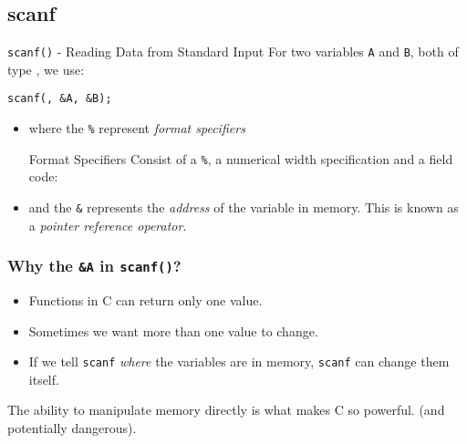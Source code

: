 \documentclass[smaller,table]{beamer} %
\begin{document}
\subsection{scanf}
\begin{frame}{{\tt scanf()} - Reading Data from Standard Input}
For two variables {\tt A} and {\tt B}, both of type , we use:
\begin{center}
\tt scanf(, \&A, \&B);
\end{center}
\begin{itemize}
\item where the {\tt\%} represent \emph{format specifiers}
\begin{block}{Format Specifiers}
Consist of a {\tt\%}, a numerical width specification and a field code:
\end{block}
\item and the {\tt\&} represents the \emph{address} of the variable in memory. This is known as a \emph{pointer reference operator}.
\end{itemize}
\end{frame}

\begin{frame}
\frametitle{Why the {\tt \&A} in {\tt scanf()}?}
\begin{itemize}
\item Functions in C can return only one value.
\item Sometimes we want more than one value to change.
\item If we tell {\tt scanf} \emph{where} the variables are in memory,
{\tt scanf} can change them itself.
\end{itemize}

\begin{alertblock}{}
The ability to manipulate memory directly is what makes C so powerful.
(and potentially dangerous).
\end{alertblock}
\end{frame}
\end{document}
